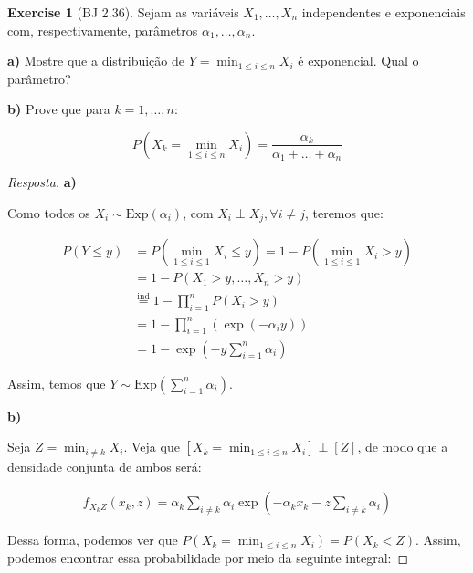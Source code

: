 \documentclass[
]{article}
\theoremstyle{definition}
\theoremstyle{definition}
\theoremstyle{definition}
\newtheorem{exercise}{Exercise}[section]
\theoremstyle{definition}
\theoremstyle{remark}
\begin{document}
\begin{exercise}[BJ 2.36]
Sejam as variáveis \(X_{1},\ldots,X_{n}\) independentes e exponenciais com, respectivamente, parâmetros \(\alpha_{1},\ldots,\alpha_{n}\).

\textbf{a)} Mostre que a distribuição de \(Y = \min_{1 \le i \le n}X_{i}\) é exponencial. Qual o parâmetro?

\textbf{b)} Prove que para \(k = 1,\ldots,n\):

\begin{equation*}
P\left(X_{k} = \min_{1 \le i \le n}X_{i}\right) = \frac{\alpha_{k}}{\alpha_{1} + \ldots + \alpha_{n}}
\end{equation*}
\end{exercise}

\begin{proof}[Resposta]
\textbf{a)}

Como todos os \(X_{i} \sim \mathrm{Exp}(\alpha_{i})\), com \(X_{i} \perp X_{j}, \forall i \neq j\), teremos que:

\begin{align*}
P(Y \le y) &= P\left(\min_{1 \le i \le 1}X_{i} \le y\right) = 1 - P\left(\min_{1 \le i \le 1}X_{i} > y\right) \\
&= 1 - P(X_{1} > y, \ldots, X_{n} > y) \\
&\stackrel{\text{ind}}{=} 1 - \prod_{i=1}^{n}P(X_{i} > y) \\
&= 1 - \prod_{i=1}^{n}(\exp(-\alpha_{i}y)) \\
&= 1 - \exp\left(-y\sum_{i=1}^{n}\alpha_{i}\right)
\end{align*}

Assim, temos que \(Y \sim \mathrm{Exp}\left(\sum_{i=1}^{n}\alpha_{i}\right)\).

\textbf{b)}

Seja \(Z = \min_{i \neq k}X_{i}\). Veja que \([X_{k} = \min_{1 \le i \le n}X_{i}] \perp [Z]\), de modo que a densidade conjunta de ambos será:

\begin{align*}
f_{X_{k}Z}(x_{k},z) = \alpha_{k}\sum_{i \neq k}\alpha_{i}\exp\left(-\alpha_{k}x_{k} - z\sum_{i \neq k}\alpha_{i}\right)
\end{align*}

Dessa forma, podemos ver que \(P\left(X_{k} = \min_{1 \le i \le n}X_{i}\right) = P(X_{k} < Z)\). Assim, podemos encontrar essa probabilidade por meio da seguinte integral:


\end{proof}
\end{document}
